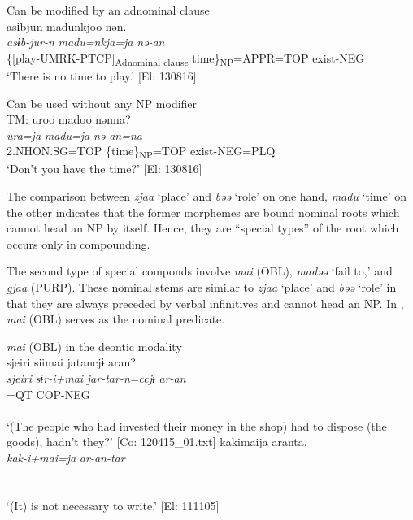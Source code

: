 \ea \label{ex:4.30}
\ea Can be modified by an adnominal clause\\\label{ex:4.30a}
\glll  asɨbjun  madunkjoo  nən.\\
    \textit{asɨb-jur-n}  \textit{madu=nkja=ja}  \textit{nə-an}\\
    \{[play-UMRK-PTCP]\textsubscript{Adnominal clause} time\}\textsubscript{NP}=APPR=TOP  exist-NEG\\
    \glt     ‘There is no time to play.’ [El: 130816]

\ex Can be used without any NP modifier\\\label{ex:4.30b}
\glll  TM:  uroo  madoo  nənna?\\
    \textit{ura=ja}  \textit{madu=ja}  \textit{nə-an=na}\\
    2.NHON.SG=TOP\textsubscript{} \{time\}\textsubscript{NP}=TOP  exist-NEG=PLQ\\
    \glt     ‘Don’t you have the time?’ [El: 130816]
\z
\z

The comparison between \textit{zjaa} ‘place’ and \textit{bəə} ‘role’ on one hand, \textit{madu} ‘time’ on the other indicates that the former morphemes are bound nominal roots which cannot head an NP by itself. Hence, they are “special types” of the root which occurs only in compounding.

The second type of special componds involve \textit{mai} (OBL), \textit{madəə} ‘fail to,’ and \textit{gjaa} (PURP). These nominal stems are similar to \textit{zjaa} ‘place’ and \textit{bəə} ‘role’ in that they are always preceded by verbal infinitives and cannot head an NP. In , \textit{mai} (OBL) serves as the nominal predicate. 

\ea  \textit{mai} (OBL) in the deontic modality \label{ex:4.31}
  \ea{}\\
\gllll {\textbar}sjeiri{\textbar}  siimai  jatancjɨ  aran?\\
      \textit{sjeiri}  \textit{sɨr-i+mai}  \textit{jar-tar-n=ccjɨ}  \textit{ar-an}\\
      [disposal  do-INF+OBL  COP-PST-PTCP]=QT  COP-NEG\\
      [Nominal predicate]  \\
      \glt       ‘(The people who had invested their money in the shop) had to dispose (the goods), hadn’t they?’ [Co: 120415\_01.txt]
\ex \label{ex:4.31b}%
\gllll kakimaija  aranta.\\
      \textit{kak-i+mai=ja}  \textit{ar-an-tar}\\
      [write-INF+OBL=TOP  COP-NEG-PST]\\
      [Nominal predicate]\\
      \glt       ‘(It) is not necessary to write.’ [El: 111105]
    \z
\z

